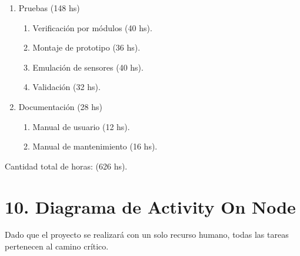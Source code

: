 \documentclass[
11pt, %
codirector, %
]{charter}
\begin{document}
\begin{enumerate}
\begin{enumerate}
	\end{enumerate}
\item Pruebas (148 hs)
	\begin{enumerate}
	\item Verificación por módulos (40 hs).
	\item Montaje de prototipo (36 hs).
	\item Emulación de sensores (40 hs).
	\item Validación (32 hs).
	\end{enumerate}
\item Documentación (28 hs)
	\begin{enumerate}
	\item Manual de usuario (12 hs).
	\item Manual de mantenimiento (16 hs).
	\end{enumerate}
\end{enumerate}

Cantidad total de horas: (626 hs).


\section{10. Diagrama de Activity On Node}
\label{sec:AoN}

Dado que el proyecto se realizará con un solo recurso humano, todas las tareas pertenecen al camino crítico.
\end{document}
